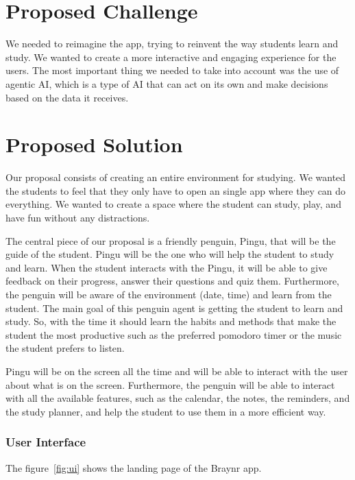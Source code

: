 \documentclass{report}
\begin{document}
\section{Proposed Challenge}
We needed to reimagine the app, trying to reinvent the way students learn and study. We wanted to create a more interactive and engaging experience for the users. The most important thing we needed to take into account was the use of agentic AI, which is a type of AI that can act on its own and make decisions based on the data it receives.

\section{Proposed Solution}

Our proposal consists of creating an entire environment for studying. We wanted the students to feel that they only have to open an single app where they can do everything. We wanted to create a space where the student can study, play, and have fun without any distractions. 

The central piece of our proposal is a friendly penguin, Pingu, that will be the guide of the student. Pingu will be the one who will help the student to study and learn. When the student interacts with the Pingu, it will be able to give feedback on their progress, answer their questions and quiz them. Furthermore, the penguin will be aware of the environment (date, time) and learn from the student. The main goal of this penguin agent is getting the student to learn and study. So, with the time it should learn the habits and methods that make the student the most productive such as the preferred pomodoro timer or the music the student prefers to listen.

Pingu will be on the screen all the time and will be able to interact with the user about what is on the screen. Furthermore, the penguin will be able to interact with all the available features, such as the calendar, the notes, the reminders, and the study planner, and help the student to use them in a more efficient way.



\subsubsection{User Interface}

The figure~\ref{fig:ui} shows the landing page of the Braynr app.
\end{document}
